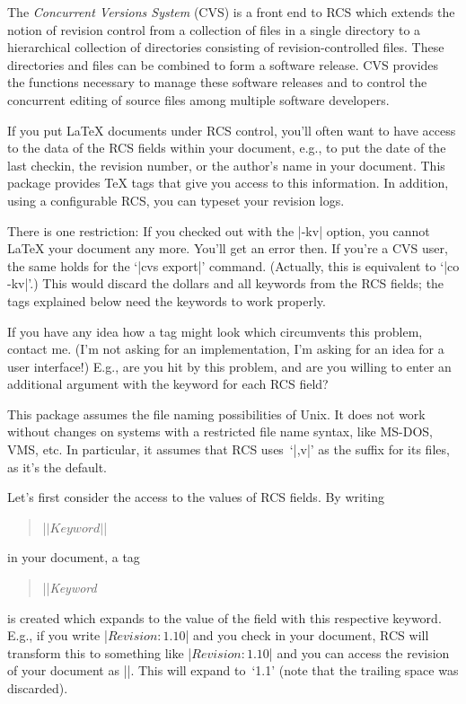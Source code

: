The \textsl{Concurrent Versions System} (CVS) is a front end to RCS
which extends the notion of revision control from a collection of
files in a single directory to a hierarchical collection of
directories consisting of revision-controlled files.  These
directories and files can be combined to form a software
release.  CVS provides the functions necessary to manage these
software releases and to control the concurrent editing of source
files among multiple software developers.


\sect If you put \LaTeX{} documents under RCS control, you'll often want to
have access to the data of the RCS fields within your document, e.g.,
to put the date of the last checkin, the revision number, or the
author's name in your document. This package provides \TeX{}
tags that give you access to this information. In addition, using a
configurable RCS, you can typeset your revision logs.


\sect There is one restriction: If you checked out with the |-kv|
option, you cannot \LaTeX{} your document any more. You'll get an
error then. If you're a CVS user, the same holds for the `|cvs export|'
command. (Actually, this is equivalent to `|co -kv|'.) This
would discard the dollars and all keywords from the RCS fields; the
tags explained below need the keywords to work properly.

If you have any idea how a tag might look which circumvents this
problem, contact me. (I'm not asking for an implementation, I'm asking for an
idea for a user interface!) E.g., are you hit by this problem, and are
you willing to enter an additional argument with the keyword for each
RCS field?

\medskip

This package assumes the file naming possibilities of Unix. It does not
work without changes on systems with a restricted file name syntax,
like MS-DOS, VMS, etc. In particular, it assumes that RCS uses~`|,v|'
as the suffix for its files, as it's the default.


\sect Let's first consider the access to the values of RCS
fields. By writing
%
\begin{quote}
  |\RCS $|\textit{Keyword}|$|
\end{quote}
%
in your document, a tag
%
\begin{quote}
  |\RCS|\textit{Keyword}
\end{quote}
%
is created which expands to the value of the field with this
respective keyword. E.g., if you write |\RCS $Revision: 1.10 $| and you
check in your document, RCS will transform this to something like
|\RCS $Revision: 1.10 $| and you can access the revision of your
document as |\RCSRevision|. This will expand to~`1.1' (note that the
trailing space was discarded).

